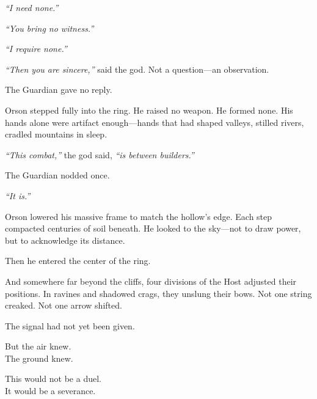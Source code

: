 \documentclass[9pt]{article}
\begin{document}
\vspace{0.5em}
\textit{``I need none.''}

\vspace{0.5em}
\textit{``You bring no witness.''}

\vspace{0.5em}
\textit{``I require none.''}

\vspace{0.5em}
\textit{``Then you are sincere,''} said the god. Not a question---an observation.

\vspace{0.5em}
The Guardian gave no reply.

\vspace{0.5em}
Orson stepped fully into the ring. He raised no weapon. He formed none. His hands alone were artifact enough---hands that had shaped valleys, stilled rivers, cradled mountains in sleep.

\vspace{0.5em}
\textit{``This combat,''} the god said, \textit{``is between builders.''}

\vspace{0.5em}
The Guardian nodded once.

\vspace{0.5em}
\textit{``It is.''}

\vspace{0.5em}
Orson lowered his massive frame to match the hollow’s edge. Each step compacted centuries of soil beneath. He looked to the sky---not to draw power, but to acknowledge its distance.

\vspace{0.5em}
Then he entered the center of the ring.

\vspace{0.5em}
And somewhere far beyond the cliffs, four divisions of the Host adjusted their positions. In ravines and shadowed crags, they unslung their bows. Not one string creaked. Not one arrow shifted.

\vspace{0.5em}
The signal had not yet been given.

\vspace{0.5em}
But the air knew.\\
The ground knew.

\vspace{0.5em}
This would not be a duel.\\
It would be a severance.


\newpage
\end{document}
